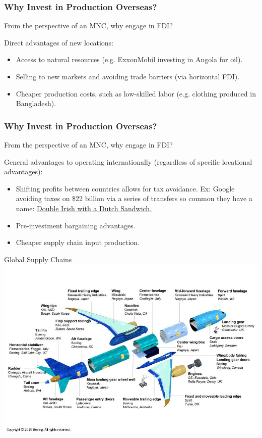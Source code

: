 \documentclass{beamer}
\begin{document}
\begin{frame} 
	\frametitle{\LARGE{Why Invest in Production Overseas?}}
	From the perspective of an MNC, why engage in FDI?
	\begin{itemize}
		\large{
			\item Direct advantages of new locations: \pause 
			\begin{itemize}
				\item Access to natural resources (e.g. ExxonMobil investing in Angola for oil). \pause 
				\item Selling to new markets and avoiding trade barriers (via horizontal FDI). \pause 
				\item Cheaper production costs, such as low-skilled labor (e.g. clothing produced in Bangladesh).  
			\end{itemize}
		}
	\end{itemize}
\end{frame}

\begin{frame} 
	\frametitle{\LARGE{Why Invest in Production Overseas?}}
	From the perspective of an MNC, why engage in FDI?
	\begin{itemize}
		\large{
			\item General advantages to operating internationally (regardless of specific locational advantages): \pause 
			\begin{itemize}
				\item Shifting profits between countries allows for tax avoidance. Ex: Google avoiding taxes on \$22 billion via a series of transfers so common they have a name: \href{https://www.investopedia.com/terms/d/double-irish-with-a-dutch-sandwich.asp}{Double Irish with a Dutch Sandwich.} \pause 
				\item Pre-investment bargaining advantages.\pause
				\item Cheaper supply chain input production.
			\end{itemize}
		}
	\end{itemize}
\end{frame}


\begin{frame}{\LARGE Global Supply Chains}
	\centering
	\includegraphics[width=\textwidth,height=0.8\textheight,keepaspectratio]{airplane gsc.jpg}
\end{frame}
\end{document}

